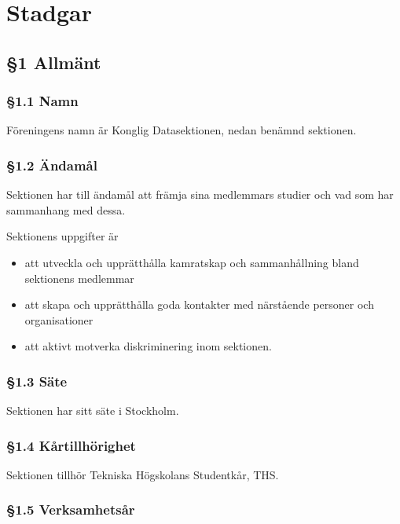 \section{Stadgar}

\subsection{§1 Allmänt}

\subsubsection{§1.1 Namn}

Föreningens namn är Konglig Datasektionen, nedan benämnd sektionen.

\subsubsection{§1.2 Ändamål}

Sektionen har till ändamål att främja sina medlemmars studier och vad som har sammanhang med dessa.

Sektionens uppgifter är

\begin{itemize}
  \item att utveckla och upprätthålla kamratskap och sammanhållning bland sektionens medlemmar
  \item att skapa och upprätthålla goda kontakter med närstående personer och organisationer
  \item att aktivt motverka diskriminering inom sektionen.
\end{itemize}

\subsubsection{§1.3 Säte}

Sektionen har sitt säte i Stockholm.

\subsubsection{§1.4 Kårtillhörighet}

Sektionen tillhör Tekniska Högskolans Studentkår, THS.

\subsubsection{§1.5 Verksamhetsår}

